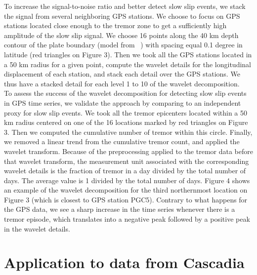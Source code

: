\documentclass{article}
\begin{document}
To increase the signal-to-noise ratio and better detect slow slip events, we stack the signal from several neighboring GPS stations. We choose to focus on GPS stations located close enough to the tremor zone to get a sufficiently high amplitude of the slow slip signal. We choose 16 points along the 40 km depth contour of the plate boundary (model from ~\citet{PRE_2003}) with spacing equal 0.1 degree in latitude (red triangles on Figure 3). Then we took all the GPS stations located in a 50 km radius for a given point, compute the wavelet details for the longitudinal displacement of each station, and stack each detail over the GPS stations. We thus have a stacked detail for each level 1 to 10 of the wavelet decomposition. \\

To assess the success of the wavelet decomposition for detecting slow slip events in GPS time series, we validate the approach by comparing to an independent proxy for slow slip events. We took all the tremor epicenters located within a 50 km radius centered on one of the 16 locations marked by red triangles on Figure 3. Then we computed the cumulative number of tremor within this circle. Finally, we removed a linear trend from the cumulative tremor count, and applied the wavelet transform. Because of the preprocessing applied to the tremor data before that wavelet transform, the measurement unit associated with the corresponding wavelet details is the fraction of tremor in a day divided by the total number of days. The average value is 1 divided by the total number of days. Figure 4 shows an example of the wavelet decomposition for the third northernmost location on Figure 3 (which is closest to GPS station PGC5). Contrary to what happens for the GPS data, we see a sharp increase in the time series whenever there is a tremor episode, which translates into a negative peak followed by a positive peak in the wavelet details.

\section{Application to data from Cascadia}
\end{document}
